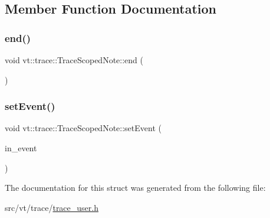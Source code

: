 \subsection{Member Function Documentation}
\mbox{\label{structvt_1_1trace_1_1_trace_scoped_note_abfffe38b863ed36f508a3aecef7c094b}} 
\subsubsection{\texorpdfstring{end()}{end()}}
{\footnotesize\ttfamily void vt\+::trace\+::\+Trace\+Scoped\+Note\+::end (\begin{DoxyParamCaption}{ }\end{DoxyParamCaption})\hspace{0.3cm}{\ttfamily [inline]}}

\mbox{\label{structvt_1_1trace_1_1_trace_scoped_note_aebd0afbbbe580b82d5669c8a90a1bc01}} 
\subsubsection{\texorpdfstring{set\+Event()}{setEvent()}}
{\footnotesize\ttfamily void vt\+::trace\+::\+Trace\+Scoped\+Note\+::set\+Event (\begin{DoxyParamCaption}\item[{\hyperlink{namespacevt_1_1trace_a64a7185f3e102df8d8258f263ccd1582}{Trace\+Event\+I\+D\+Type} const}]{in\+\_\+event }\end{DoxyParamCaption})\hspace{0.3cm}{\ttfamily [inline]}}



The documentation for this struct was generated from the following file\+:\begin{DoxyCompactItemize}
\item 
src/vt/trace/\hyperlink{trace__user_8h}{trace\+\_\+user.\+h}\end{DoxyCompactItemize}

